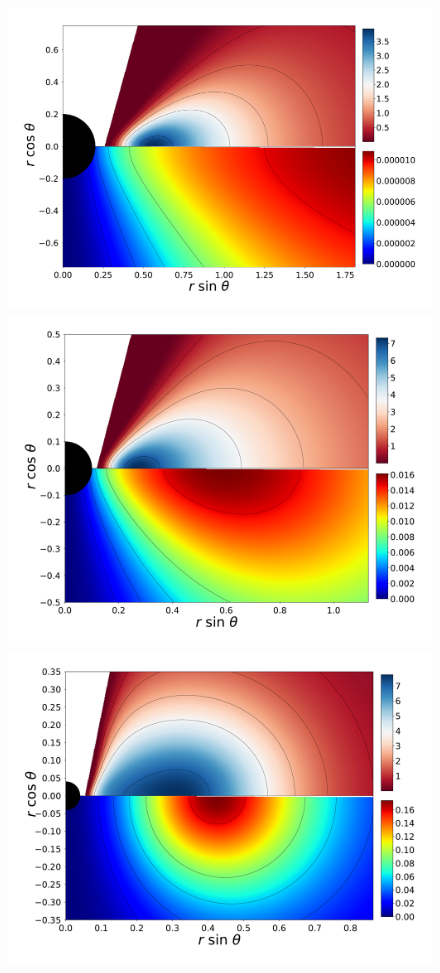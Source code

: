 \documentclass[twocolumn,aps,showpacs,showkeys,prd,superscriptaddress,byrevtex, amsmath]{revtex4-1}
\begin{document}
\begin{figure}
\centering
\includegraphics[scale=0.1267]{figures/fig5_I_10.pdf}
\hspace{-0.3cm}
\includegraphics[scale=0.12]{figures/fig5_IV_10.pdf}
\hspace{-0.3cm}
\includegraphics[scale=0.1267]{figures/fig5_VII_10.pdf}

\end{figure}
\end{document}
